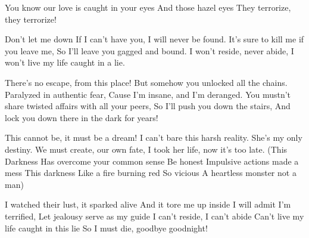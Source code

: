 \beginchorus
You know our love is caught in your eyes
And those hazel eyes
They terrorize, they terrorize!
\endchorus

\beginverse
Don't let me down
If I can't have you, I will never be found.
It's sure to kill me if you leave me,
So I'll leave you gagged and bound.
I won't reside, never abide,
I won't live my life caught in a lie.
\endverse

\beginchorus
There's no escape, from this place!
But somehow you unlocked all the chains.
Paralyzed in authentic fear,
Cause I'm insane, and I'm deranged.
You mustn't share twisted affairs with all your peers,
So I'll push you down the stairs,
And lock you down there in the dark for years!
\endchorus

\beginverse
[Outro]
This cannot be, it must be a dream!
I can't bare this harsh reality.
She's my only destiny.
We must create, our own fate,
I took her life, now it's too late.
(This Darkness
Has overcome your common sense
Be honest
Impulsive actions made a mess
This darkness
Like a fire burning red
So vicious
A heartless monster not a man)
\endverse

\beginchorus
I watched their lust, it sparked alive
And it tore me up inside
I will admit I'm terrified,
Let jealousy serve as my guide
I can't reside, I can't abide
Can't live my life caught in this lie
So I must die, goodbye goodnight!
\endchorus


\endsong
